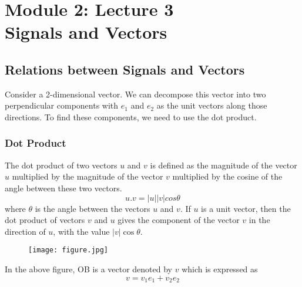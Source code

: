 \section{Module 2: Lecture 3\\Signals and Vectors}


\subsection{Relations between Signals and Vectors}
Consider a 2-dimensional vector. We can decompose this vector into two perpendicular components with $e_1$ and $e_2$ as the unit vectors along those directions. To find these components, we need to use the dot product.
\subsubsection{Dot Product}
	The dot product of two vectors $u$ and $v$ is defined as the magnitude of the vector $u$ multiplied by the magnitude of the vector $v$ multiplied by the cosine of the angle between these two vectors.
    \begin{equation*}u.v = |u||v|cos\theta\end{equation*}
  where $\theta$ is the angle between the vectors $u$ and $v$. If $u$ is a unit vector, then the dot product of vectors $v$ and $u$ gives the component of the vector $v$ in the direction of $u$, with the value $|v|\cos \theta$.
	\begin{figure}[ht]
    \centering
    \texttt{[image: figure.jpg]}
  \end{figure} 
  In the above figure, OB is a vector denoted by $v$ which is expressed as
    \begin{equation*}v = v_1e_1 + v_2e_2\end{equation*}
    
